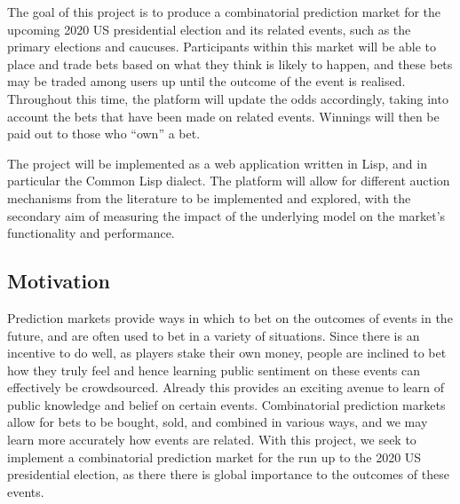\documentclass[10pt,a4paper]{article}
\theoremstyle{plain}
\theoremstyle{definition}
\begin{document}
	The goal of this project is to produce a combinatorial prediction market
	for the upcoming 2020 US presidential election and its related events, such
	as the primary elections and caucuses. Participants within this market will
	be able to place and trade bets based on what they think is likely to
	happen, and these bets may be traded among users up until the outcome of
	the event is realised. Throughout this time, the platform will update the
	odds accordingly, taking into account the bets that have been made on
	related events. Winnings will then be paid out to those who ``own'' a bet.

	The project will be implemented as a web application written in Lisp, and
	in particular the Common Lisp dialect. The platform will allow for
	different auction mechanisms from the literature to be implemented and
	explored, with the secondary aim of measuring the impact of the underlying
	model on the market's functionality and performance.

	\subsection{Motivation}

	Prediction markets provide ways in which to bet on the outcomes of events
	in the future, and are often used to bet in a variety of situations. Since
	there is an incentive to do well, as players stake their own money, people
	are inclined to bet how they truly feel and hence learning public sentiment
	on these events can effectively be crowdsourced. Already this provides an
	exciting avenue to learn of public knowledge and belief on certain events.
	Combinatorial prediction markets allow for bets to be bought, sold, and
	combined in various ways, and we may learn more accurately how events are
	related. With this project, we seek to implement a combinatorial prediction
	market for the run up to the 2020 US presidential election, as there there
	is global importance to the outcomes of these events.
\end{document}
